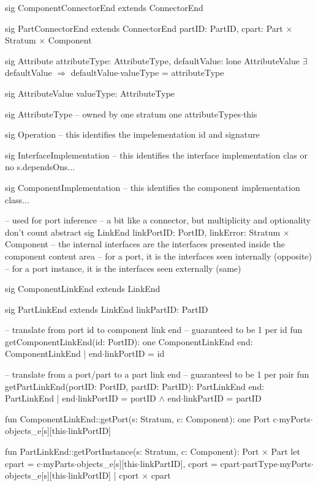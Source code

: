 sig ComponentConnectorEnd extends ConnectorEnd
{
}

sig PartConnectorEnd extends ConnectorEnd
{
    partID: PartID,
    cpart: Part$\,\times\,$Stratum$\,\times\,$Component
}


sig Attribute
{
  attributeType: AttributeType,
  defaultValue: lone AttributeValue
}
{
  $\exists\,$defaultValue $\Longrightarrow$
    defaultValue$\cdot$valueType = attributeType
}

sig AttributeValue
{
  valueType: AttributeType
}

sig AttributeType
{
}
{
  -- owned by one stratum
  one attributeTypes$\cdot$this
}

sig Operation
{
  -- this identifies the impelementation id and signature
}

sig InterfaceImplementation
{
  -- this identifies the interface implementation clas or no s.dependsOns...
}

sig ComponentImplementation
{
  -- this identifies the component implementation class...
}

-- used for port inference
-- a bit like a connector, but multiplicity and optionality don't count
abstract sig LinkEnd
{
  linkPortID: PortID,
  linkError: Stratum$\,\times\,$Component
  -- the internal interfaces are the interfaces presented inside the component content area
  --   for a port, it is the interfaces seen internally (opposite)
  --   for a port instance, it is the interfaces seen externally (same)
}

sig ComponentLinkEnd extends LinkEnd
{
}

sig PartLinkEnd extends LinkEnd
{
  linkPartID: PartID
}

-- translate from port id to component link end -- guaranteed to be 1 per id
fun getComponentLinkEnd(id: PortID): one ComponentLinkEnd
{
  { end: ComponentLinkEnd | end$\cdot$linkPortID = id }
}

-- translate from a port/part to a part link end -- guaranteed to be 1 per pair
fun getPartLinkEnd(portID: PortID, partID: PartID): PartLinkEnd
{
  { end: PartLinkEnd | end$\cdot$linkPortID = portID $\wedge$ end$\cdot$linkPartID = partID }
}

fun ComponentLinkEnd::getPort(s: Stratum, c: Component): one Port
{
  c$\cdot$myPorts$\cdot$objects_e[s][this$\cdot$linkPortID]
}

fun PartLinkEnd::getPortInstance(s: Stratum, c: Component): Port$\,\times\,$Part
{
  let
    cpart = c$\cdot$myParts$\cdot$objects_e[s][this$\cdot$linkPartID],
    cport = cpart$\cdot$partType$\cdot$myPorts$\cdot$objects_e[s][this$\cdot$linkPortID] |
  cport$\,\times\,$cpart
}

